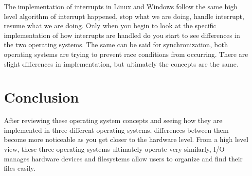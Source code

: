\documentclass[10pt,serif,draftclsnofoot,onecolumn]{IEEEtran}
\begin{document}
	\newline
	\par
	The implementation of interrupts in Linux and Windows follow the same high level algorithm of interrupt happened, stop what we are doing, handle interrupt, resume what we are doing. Only when you begin to look at the specific implementation of how interrupts are handled do you start to see differences in the two operating systems. The same can be said for synchronization, both operating systems are trying to prevent race conditions from occurring. There are slight differences in implementation, but ultimately the concepts are the same. 
\section{Conclusion}
	\par
	After reviewing these operating system concepts and seeing how they are implemented in three different operating systems, differences between them become more noticeable as you get closer to the hardware level. From a high level view, these three operating systems ultimately operate very similarly, I/O manages hardware devices and filesystems allow users to organize and find their files easily. 
	
	\newpage
	
	
	
	
\end{document}
